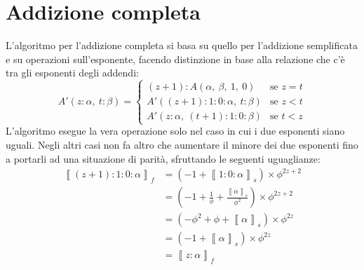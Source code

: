 \documentclass[Lau,oneside]{sapthesis}
\begin{document}
\section{Addizione completa}
L'algoritmo per l'addizione completa si basa su quello per l'addizione semplificata e su operazioni sull'esponente, facendo distinzione in base alla relazione che c'è tra gli esponenti degli addendi:
\begin{equation*}
A'(z:\alpha, \ t:\beta) = \begin{cases}
(z+1):A(\alpha, \ \beta, \ 1, \ 0) & \text{se $z=t$}\\
A'((z+1):1:0:\alpha, \ t:\beta) & \text{se $z<t$}\\
A'(z:\alpha, \ (t+1):1:0:\beta) & \text{se $t<z$}
\end{cases}
\end{equation*}
L'algoritmo esegue la vera operazione solo nel caso in cui i due esponenti siano uguali. Negli altri casi non fa altro che aumentare il minore dei due esponenti fino a portarli ad una situazione di parità, sfruttando le seguenti uguaglianze:
\begin{align*}
\left\llbracket (z+1):1:0:\alpha \right\rrbracket_f & = \left( - 1 + \left\llbracket 1:0:\alpha \right\rrbracket_s \right) \times \phi^{2z+2}\\
& = \left( - 1 + \frac{1}{\phi} + \frac{\left\llbracket \alpha \right\rrbracket_s}{\phi^2} \right) \times \phi^{2z+2}\\
& = \left( - \phi^2 + \phi + \left\llbracket \alpha \right\rrbracket_s \right) \times \phi^{2z}\\
& = \left( - 1 + \left\llbracket \alpha \right\rrbracket_s \right) \times \phi^{2z}\\
& = \left\llbracket z:\alpha \right\rrbracket_f
\end{align*}
\end{document}
